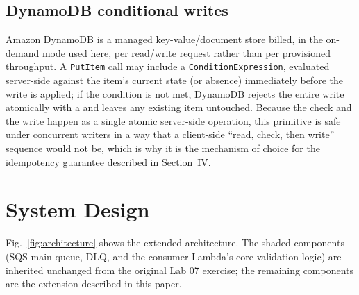 \documentclass[conference]{IEEEtran}
\begin{document}
\subsection{DynamoDB conditional writes}
Amazon DynamoDB is a managed key-value/document store billed, in the on-demand mode used here, per read/write request rather than per provisioned throughput. A \texttt{PutItem} call may include a \texttt{ConditionExpression}, evaluated server-side against the item's current state (or absence) immediately before the write is applied; if the condition is not met, DynamoDB rejects the entire write atomically with a \texttt{} and leaves any existing item untouched. Because the check and the write happen as a single atomic server-side operation, this primitive is safe under concurrent writers in a way that a client-side ``read, check, then write'' sequence would not be, which is why it is the mechanism of choice for the idempotency guarantee described in Section~IV.

\section{System Design}

Fig.~\ref{fig:architecture} shows the extended architecture. The shaded components (SQS main queue, DLQ, and the consumer Lambda's core validation logic) are inherited unchanged from the original Lab 07 exercise; the remaining components are the extension described in this paper.
\end{document}

